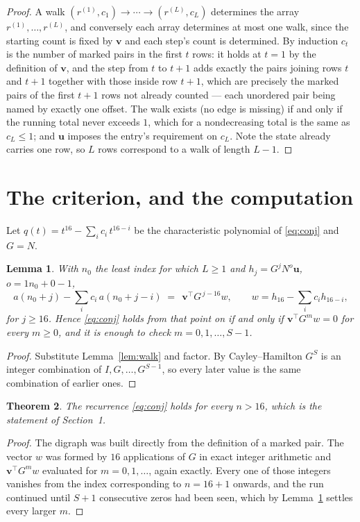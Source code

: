 \documentclass[11pt,a4paper]{article}
\theoremstyle{plain}
\newtheorem{theorem}{Theorem}
\newtheorem{lemma}[theorem]{Lemma}
\theoremstyle{definition}
\begin{document}
\begin{proof}
A walk $(r^{(1)},c_1)\to\cdots\to(r^{(L)},c_L)$ determines the array
$r^{(1)},\dots,r^{(L)}$, and conversely each array determines at most one walk, since the
starting count is fixed by $\mathbf{v}$ and each step's count is determined. By induction
$c_t$ is the number of marked pairs in the first $t$ rows: it holds at $t=1$ by the
definition of $\mathbf{v}$, and the step from $t$ to $t+1$ adds exactly the pairs joining
rows $t$ and $t+1$ together with those inside row $t+1$, which are precisely the marked
pairs of the first $t+1$ rows not already counted --- each unordered pair being named by
exactly one offset. The walk exists (no edge is missing) if and only if the running total
never exceeds $1$, which for a nondecreasing total is the same as $c_L\le1$; and
$\mathbf{u}$ imposes the entry's requirement on $c_L$. Note the state already carries one
row, so $L$ rows correspond to a walk of length $L-1$.
\end{proof}

\section{The criterion, and the computation}

Let $q(t)=t^{16}-\sum_i c_i\,t^{16-i}$ be the characteristic polynomial of
\eqref{eq:conj} and $G=N$.

\begin{lemma}\label{lem:crit}
With $n_0$ the least index for which $L\ge1$ and $h_j=G^{j}N^{o}\mathbf{u}$,
$o=1n_0+0-1$,
\[
a(n_0+j)-\sum_i c_i\,a(n_0+j-i)\;=\;\,\mathbf{v}^{\!\top}G^{\,j-16}w,
\qquad w=h_{16}-\sum_i c_i h_{16-i},
\]
for $j\ge16$. Hence \eqref{eq:conj} holds from that point on if and only if
$\mathbf{v}^{\!\top}G^{m}w=0$ for every $m\ge0$, and it is enough to check
$m=0,1,\dots,S-1$.
\end{lemma}

\begin{proof}
Substitute Lemma~\ref{lem:walk} and factor. By Cayley--Hamilton $G^{S}$ is an integer
combination of $I,G,\dots,G^{S-1}$, so every later value is the same combination of earlier
ones.
\end{proof}

\begin{theorem}
The recurrence \eqref{eq:conj} holds for every $n>16$, which is the statement of
Section~1.
\end{theorem}

\begin{proof}
The digraph was built directly from the definition of a marked pair. The vector $w$ was
formed by $16$ applications of $G$ in exact integer arithmetic and
$\mathbf{v}^{\!\top}G^{m}w$ evaluated for $m=0,1,\dots$, again exactly. Every one of
those integers vanishes from the index corresponding to $n=16+1$ onwards, and the run
continued until $S+1$ consecutive zeros had been seen, which by Lemma~\ref{lem:crit}
settles every larger $m$.
\end{proof}
\end{document}

